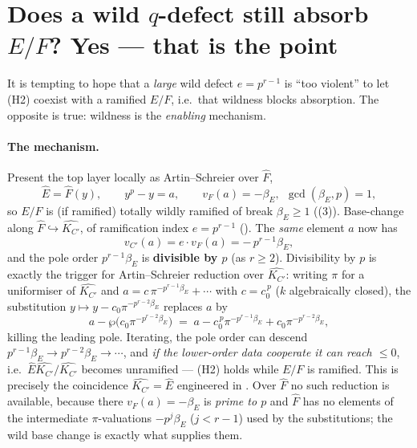 \documentclass[11pt]{article}
\begin{document}
\section{Does a wild $q$-defect still absorb $E/F$? Yes --- that is the point}
\label{sec:absorb}

It is tempting to hope that a \emph{large} wild defect $e=p^{r-1}$ is ``too
violent'' to let (H2) coexist with a ramified $E/F$, i.e.\ that wildness blocks
absorption. The opposite is true: wildness is the \emph{enabling} mechanism.

\paragraph{The mechanism.}
Present the top layer locally as Artin--Schreier over $\widehat F$,
\[
\widehat E=\widehat F(y),\qquad y^p-y=a,\qquad v_F(a)=-\beta_E,\ \ \gcd(\beta_E,p)=1,
\]
so $E/F$ is (if ramified) totally wildly ramified of break $\beta_E\ge1$
((3)). Base-change along
$\widehat F\hookrightarrow\widehat{K_{C'}}$, of ramification index
$e=p^{r-1}$ (). The \emph{same} element $a$ now has
\begin{equation}\label{eq:scale}
v_{C'}(a)=e\cdot v_F(a)=-\,p^{r-1}\beta_E,
\end{equation}
and the pole order $p^{r-1}\beta_E$ is \textbf{divisible by $p$} (as $r\ge2$).
Divisibility by $p$ is exactly the trigger for Artin--Schreier reduction over
$\widehat{K_{C'}}$: writing $\pi$ for a uniformiser of $\widehat{K_{C'}}$ and
$a=c\,\pi^{-p^{r-1}\beta_E}+\cdots$ with $c=c_0^{\,p}$ ($k$ algebraically
closed), the substitution $y\mapsto y-c_0\pi^{-p^{r-2}\beta_E}$ replaces $a$ by
\[
a-\wp\!\big(c_0\pi^{-p^{r-2}\beta_E}\big)
 \;=\; a-c_0^{\,p}\pi^{-p^{r-1}\beta_E}+c_0\pi^{-p^{r-2}\beta_E},
\]
killing the leading pole. Iterating, the pole order can descend
$p^{r-1}\beta_E\to p^{r-2}\beta_E\to\cdots$, and \emph{if the lower-order data
cooperate it can reach $\le0$}, i.e.\ $\widehat E\widehat{K_{C'}}/\widehat{K_{C'}}$
becomes unramified --- (H2) holds while $E/F$ is ramified. This is precisely the
coincidence $\widehat{K_{C'}}=\widehat E$ engineered in
. Over $\widehat F$ no such reduction is available,
because there $v_F(a)=-\beta_E$ is \emph{prime to $p$} and $\widehat F$ has no
elements of the intermediate $\pi$-valuations $-p^{j}\beta_E$ ($j<r-1$) used by
the substitutions; the wild base change is exactly what supplies them.
\end{document}
